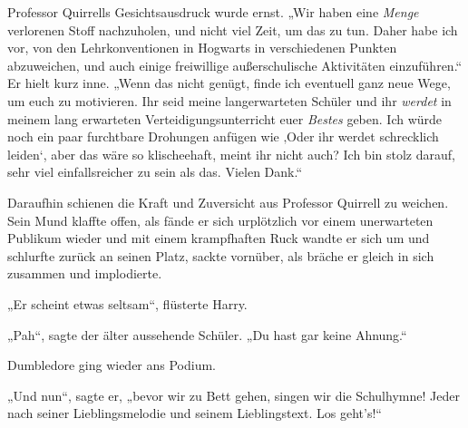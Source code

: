 Professor Quirrells Gesichtsausdruck wurde ernst.
„Wir haben eine \emph{Menge} verlorenen Stoff nachzuholen, und nicht viel Zeit, um das zu tun. Daher habe ich vor, von den Lehrkonventionen in Hogwarts in verschiedenen Punkten abzuweichen, und auch einige freiwillige außerschulische Aktivitäten einzuführen.“ Er hielt kurz inne.
„Wenn das nicht genügt, finde ich eventuell ganz neue Wege, um euch zu motivieren. Ihr seid meine langerwarteten Schüler und ihr \emph{werdet} in meinem lang erwarteten Verteidigungsunterricht euer \emph{Bestes} geben. Ich würde noch ein paar furchtbare Drohungen anfügen wie ‚Oder ihr werdet schrecklich leiden‘, aber das wäre so klischeehaft, meint ihr nicht auch? Ich bin stolz darauf, sehr viel einfallsreicher zu sein als das. Vielen Dank.“

Daraufhin schienen die Kraft und Zuversicht aus Professor Quirrell zu weichen. Sein Mund klaffte offen, als fände er sich urplötzlich vor einem unerwarteten Publikum wieder und mit einem krampfhaften Ruck wandte er sich um und schlurfte zurück an seinen Platz, sackte vornüber, als bräche er gleich in sich zusammen und implodierte.

„Er scheint etwas seltsam“, flüsterte Harry.

„Pah“, sagte der älter aussehende Schüler.
„Du hast gar keine Ahnung.“

Dumbledore ging wieder ans Podium.

„Und nun“, sagte er, „bevor wir zu Bett gehen, singen wir die Schulhymne! Jeder nach seiner Lieblingsmelodie und seinem Lieblingstext. Los geht’s!“

